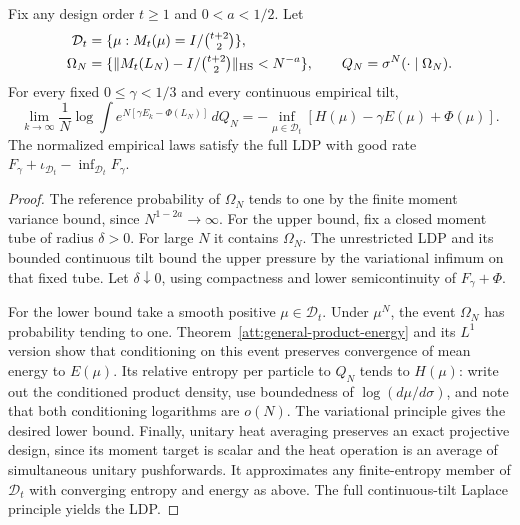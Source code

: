 \begin{theorem}
\label{att:design-laplace}
Fix any design order $t\ge1$ and $0<a<1/2$. Let
\[
 \begin{aligned}
 \mathcal D_t&=\{\mu:M_t(\mu)=I/\tbinom{t+2}{2}\},\\
 \Omega_N&=\{\|M_t(L_N)-I/\tbinom{t+2}{2}\|_{\rm HS}<N^{-a}\},
 \qquad Q_N=\sigma^N(\cdot\mid\Omega_N).
 \end{aligned}
\]
For every fixed $0\le\gamma<1/3$ and every continuous empirical tilt,
\begin{equation}
 \lim_{k\to\infty}\frac1N\log\int
 e^{N[\gamma E_k-\Phi(L_N)]}\,dQ_N
 =-\inf_{\mu\in\mathcal D_t}[H(\mu)-\gamma E(\mu)+\Phi(\mu)].
 \label{att:design-laplace-eq}
\end{equation}
The normalized empirical laws satisfy the full LDP with good rate
$F_\gamma+\iota_{\mathcal D_t}-\inf_{\mathcal D_t}F_\gamma$.
\end{theorem}

\begin{proof}
The reference probability of $\Omega_N$ tends to one by the finite
moment variance bound, since $N^{1-2a}\to\infty$.
For the upper bound, fix a closed moment tube of radius $\delta>0$.
For large $N$ it contains $\Omega_N$. The unrestricted LDP and its
bounded continuous tilt bound the upper pressure by the variational
infimum on that fixed tube. Let $\delta\downarrow0$, using compactness
and lower semicontinuity of $F_\gamma+\Phi$.

For the lower bound take a smooth positive $\mu\in\mathcal D_t$.
Under $\mu^N$, the event $\Omega_N$ has probability tending to one.
Theorem~\ref{att:general-product-energy} and its $L^1$ version show
that conditioning on this event preserves convergence of mean energy
to $E(\mu)$. Its relative entropy per particle to $Q_N$ tends to
$H(\mu)$: write out the conditioned product density, use boundedness
of $\log(d\mu/d\sigma)$, and note that both conditioning logarithms
are $o(N)$. The variational principle gives the desired lower bound.
Finally, unitary heat averaging preserves an exact projective design,
since its moment target is scalar and the heat operation is an average
of simultaneous unitary pushforwards. It approximates any finite-entropy
member of $\mathcal D_t$ with converging entropy and energy as above.
The full continuous-tilt Laplace principle yields the LDP.
\end{proof}

